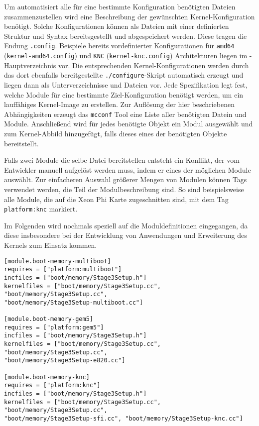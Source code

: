 Um automatisiert alle für eine bestimmte Konfiguration benötigten Dateien
zusammenzustellen wird eine Beschreibung der gewünschten Kernel-Konfiguration
benötigt. Solche Konfigurationen können als Dateien mit einer definierten
Struktur und Syntax bereitsgestellt und abgespeichert werden. Diese tragen die
Endung \texttt{.config}. Beispiele bereits vordefinierter Konfigurationen für
\texttt{amd64} (\texttt{kernel-amd64.config}) und \texttt{KNC}
(\texttt{kernel-knc.config}) Architekturen liegen im \mythos-Hauptverzeichnis
vor. Die entsprechenden Kernel-Konfigurationen werden durch das dort ebenfalls
bereitgestellte \texttt{./configure}-Skript automatisch erzeugt und liegen dann
als Unterverzeichnisse und Dateien vor. Jede Spezifikation legt fest,
welche Module für eine bestimmte Ziel-Konfiguration benötigt werden, um ein
lauffähiges Kernel-Image zu erstellen. Zur Auflösung der hier
beschriebenen Abhängigkeiten erzeugt das \texttt{mcconf} Tool eine Liste aller
benötigten Datein und Module. Anschließend wird für jedes benötigte Objekt ein
Modul ausgewählt und zum Kernel-Abbild hinzugefügt, falls dieses eines der
benötigten Objekte bereitstellt. 

Falls zwei Module die selbe Datei bereitstellen entsteht ein Konflikt, der vom
Entwickler manuell aufgelöst werden muss, indem er eines der möglichen Module
auswählt. Zur einfacheren Auswahl größerer Mengen von Modulen können Tags
verwendet werden, die Teil der Modulbeschreibung sind. So sind beispielsweise
alle Module, die auf die Xeon Phi Karte zugeschnitten sind, mit dem Tag
\texttt{platform:knc} markiert.

Im Folgenden wird nochmals speziell auf die Moduldefinitionen eingegangen, da
diese insbesondere bei der Entwicklung von Anwendungen und Erweiterung des
Kernels zum Einsatz kommen.

\begin{lstlisting}[float, label=lst:module, caption=Ein Beispiel einer 
Modulbeschreibung (\texttt{mcconf.module}).]
[module.boot-memory-multiboot]
requires = ["platform:multiboot"]
incfiles = ["boot/memory/Stage3Setup.h"]
kernelfiles = ["boot/memory/Stage3Setup.cc", "boot/memory/Stage3Setup.cc", 
"boot/memory/Stage3Setup-multiboot.cc"]

[module.boot-memory-gem5]
requires = ["platform:gem5"]
incfiles = ["boot/memory/Stage3Setup.h"]
kernelfiles = ["boot/memory/Stage3Setup.cc", "boot/memory/Stage3Setup.cc", 
"boot/memory/Stage3Setup-e820.cc"]

[module.boot-memory-knc]
requires = ["platform:knc"]
incfiles = ["boot/memory/Stage3Setup.h"]
kernelfiles = ["boot/memory/Stage3Setup.cc", "boot/memory/Stage3Setup.cc", 
"boot/memory/Stage3Setup-sfi.cc", "boot/memory/Stage3Setup-knc.cc"]
\end{lstlisting}


